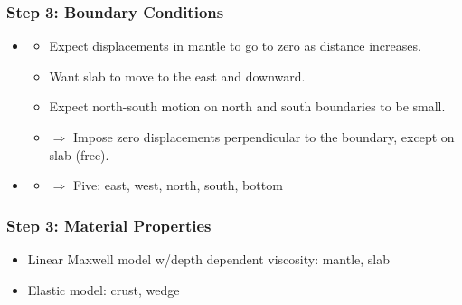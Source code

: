 \documentclass[aspectratio=169]{beamer}
\begin{document}
\begin{frame}
  \frametitle{Step 3: Boundary Conditions}
  \summary{}

  \begin{itemize}
  \item {}\pause
    \begin{itemize}
    \item Expect displacements in mantle to go to zero as distance increases.
    \item Want slab to move to the east and downward.
    \item Expect north-south motion on north and south boundaries to be small.\pause
    \item $\Rightarrow$ Impose zero displacements perpendicular to the
      boundary, except on slab (free).\pause
    \end{itemize}
  \item {}\pause
    \begin{itemize}
    \item $\Rightarrow$ Five: east, west, north, south, bottom
    \end{itemize}
  \end{itemize}  
  
\end{frame}


\begin{frame}
  \frametitle{Step 3: Material Properties}
  \summary{}

  \begin{center}
  \end{center}
  
  \vfill
  
  \begin{itemize}
  \item Linear Maxwell model w/depth dependent viscosity: mantle, slab
  \item Elastic model: crust, wedge
  \end{itemize}
  
\end{frame}
\end{document}
